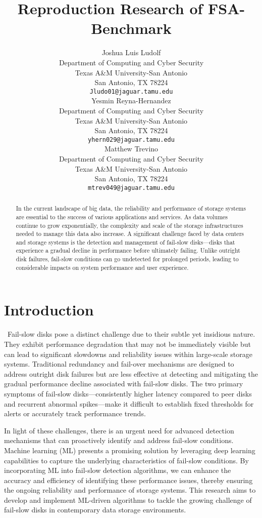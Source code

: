 \documentclass{article}
\title{Reproduction Research of FSA-Benchmark}
\author{
 Joshua Luis Ludolf \\
  Department of Computing and Cyber Security\\
  Texas A\&M University-San Antonio\\
  San Antonio, TX 78224 \\
  \texttt{Jludo01@jaguar.tamu.edu} \\
   \And
 Yesmin Reyna-Hernandez \\
  Department of Computing and Cyber Security\\
  Texas A\&M University-San Antonio\\
  San Antonio, TX 78224 \\
  \texttt{yhern029@jaguar.tamu.edu} \\
  \And
 Matthew Trevino \\
  Department of Computing and Cyber Security\\
  Texas A\&M University-San Antonio\\
  San Antonio, TX 78224 \\
  \texttt{mtrev049@jaguar.tamu.edu} \\
}
\begin{document}
\maketitle
\begin{abstract}
In the current landscape of big data, the reliability and performance of storage systems are essential to the success of various applications and services. As data volumes continue to grow exponentially, the complexity and scale of the storage infrastructures needed to manage this data also increase. A significant challenge faced by data centers and storage systems is the detection and management of fail-slow disks—disks that experience a gradual decline in performance before ultimately failing. Unlike outright disk failures, fail-slow conditions can go undetected for prolonged periods, leading to considerable impacts on system performance and user experience.
\end{abstract}




\section{Introduction}
\
\quad Fail-slow disks pose a distinct challenge due to their subtle yet insidious nature. They exhibit performance degradation that may not be immediately visible but can lead to significant slowdowns and reliability issues within large-scale storage systems. Traditional redundancy and fail-over mechanisms are designed to address outright disk failures but are less effective at detecting and mitigating the gradual performance decline associated with fail-slow disks. The two primary symptoms of fail-slow disks—consistently higher latency compared to peer disks and recurrent abnormal spikes—make it difficult to establish fixed thresholds for alerts or accurately track performance trends.

\quad In light of these challenges, there is an urgent need for advanced detection mechanisms that can proactively identify and address fail-slow conditions. Machine learning (ML) presents a promising solution by leveraging deep learning capabilities to capture the underlying characteristics of fail-slow conditions. By incorporating ML into fail-slow detection algorithms, we can enhance the accuracy and efficiency of identifying these performance issues, thereby ensuring the ongoing reliability and performance of storage systems. This research aims to develop and implement ML-driven algorithms to tackle the growing challenge of fail-slow disks in contemporary data storage environments.
\end{document}
